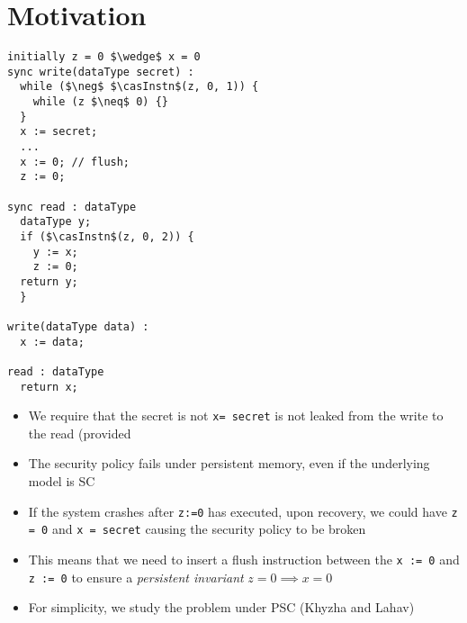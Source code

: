 \section{Motivation}





\begin{center}
\begin{minipage}{0.45\linewidth}
\begin{lstlisting}
initially z = 0 $\wedge$ x = 0
sync write(dataType secret) :
  while ($\neg$ $\casInstn$(z, 0, 1)) {
    while (z $\neq$ 0) {}
  }
  x := secret;
  ...
  x := 0; // flush;
  z := 0;

sync read : dataType
  dataType y;
  if ($\casInstn$(z, 0, 2)) {
    y := x;
    z := 0;
  return y;
  }

write(dataType data) :
  x := data;

read : dataType
  return x;
\end{lstlisting}
\end{minipage}
\end{center}



\begin{itemize}
\item We require that the secret is not \verb|x= secret| is not leaked
  from the write to the read (provided 
\item The security policy fails under persistent memory, even if the
  underlying model is SC 
\item If the system crashes after \verb|z:=0| has executed, upon
  recovery, we could have \verb|z = 0| and \verb|x = secret| causing
  the security policy to be broken
  
\item This means that we need to insert a flush
  instruction between the \verb|x := 0| and \verb|z := 0| to ensure a
  {\em persistent invariant} $z = 0 \implies x = 0$ 
\item For simplicity, we study the problem under PSC (Khyzha and
  Lahav)
\end{itemize}


